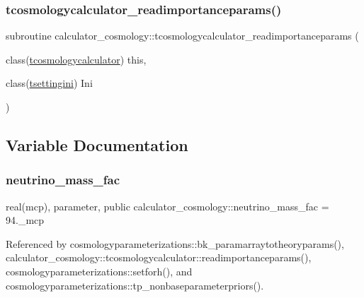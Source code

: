 \subsubsection{\texorpdfstring{tcosmologycalculator\+\_\+readimportanceparams()}{tcosmologycalculator\_readimportanceparams()}}
{\footnotesize\ttfamily subroutine calculator\+\_\+cosmology\+::tcosmologycalculator\+\_\+readimportanceparams (\begin{DoxyParamCaption}\item[{class(\mbox{\hyperlink{structcalculator__cosmology_1_1tcosmologycalculator}{tcosmologycalculator}})}]{this,  }\item[{class(\mbox{\hyperlink{structsettings_1_1tsettingini}{tsettingini}})}]{Ini }\end{DoxyParamCaption})\hspace{0.3cm}{\ttfamily [private]}}



\subsection{Variable Documentation}
\mbox{\label{namespacecalculator__cosmology_a9199e46da0bd753de17a9be358823ee0}} 
\subsubsection{\texorpdfstring{neutrino\+\_\+mass\+\_\+fac}{neutrino\_mass\_fac}}
{\footnotesize\ttfamily real(mcp), parameter, public calculator\+\_\+cosmology\+::neutrino\+\_\+mass\+\_\+fac = 94.\+\_\+mcp}



Referenced by cosmologyparameterizations\+::bk\+\_\+paramarraytotheoryparams(), calculator\+\_\+cosmology\+::tcosmologycalculator\+::readimportanceparams(), cosmologyparameterizations\+::setforh(), and cosmologyparameterizations\+::tp\+\_\+nonbaseparameterpriors().

\mbox{\label{namespacecalculator__cosmology_a807c6e74e20e797dcbf2cd848b181a95}} 
